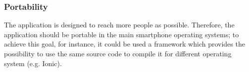 \subsubsection{Portability}
The application is designed to reach more people as possible. Therefore, the application should be portable in the main smartphone operating systems; to achieve this goal, for instance, it could be used a framework which provides the possibility to use the same source code to compile it for different operating system (e.g. Ionic). 

